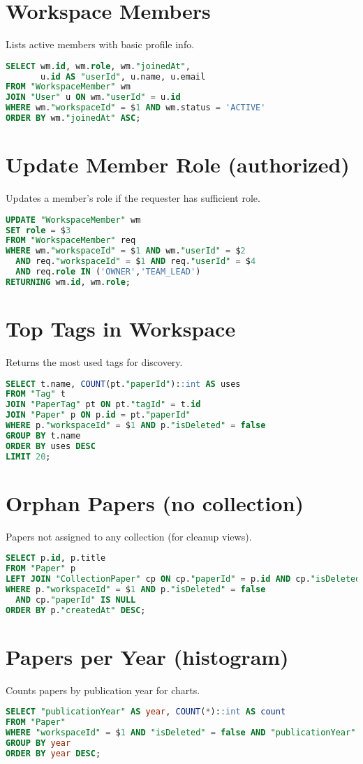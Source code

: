 \section{Workspace Members}
Lists active members with basic profile info.
\begin{lstlisting}[language=SQL]
SELECT wm.id, wm.role, wm."joinedAt",
       u.id AS "userId", u.name, u.email
FROM "WorkspaceMember" wm
JOIN "User" u ON wm."userId" = u.id
WHERE wm."workspaceId" = $1 AND wm.status = 'ACTIVE'
ORDER BY wm."joinedAt" ASC;
\end{lstlisting}

\section{Update Member Role (authorized)}
Updates a member's role if the requester has sufficient role.
\begin{lstlisting}[language=SQL]
UPDATE "WorkspaceMember" wm
SET role = $3
FROM "WorkspaceMember" req
WHERE wm."workspaceId" = $1 AND wm."userId" = $2
  AND req."workspaceId" = $1 AND req."userId" = $4
  AND req.role IN ('OWNER','TEAM_LEAD')
RETURNING wm.id, wm.role;
\end{lstlisting}

\section{Top Tags in Workspace}
Returns the most used tags for discovery.
\begin{lstlisting}[language=SQL]
SELECT t.name, COUNT(pt."paperId")::int AS uses
FROM "Tag" t
JOIN "PaperTag" pt ON pt."tagId" = t.id
JOIN "Paper" p ON p.id = pt."paperId"
WHERE p."workspaceId" = $1 AND p."isDeleted" = false
GROUP BY t.name
ORDER BY uses DESC
LIMIT 20;
\end{lstlisting}

\section{Orphan Papers (no collection)}
Papers not assigned to any collection (for cleanup views).
\begin{lstlisting}[language=SQL]
SELECT p.id, p.title
FROM "Paper" p
LEFT JOIN "CollectionPaper" cp ON cp."paperId" = p.id AND cp."isDeleted" = false
WHERE p."workspaceId" = $1 AND p."isDeleted" = false
  AND cp."paperId" IS NULL
ORDER BY p."createdAt" DESC;
\end{lstlisting}

\section{Papers per Year (histogram)}
Counts papers by publication year for charts.
\begin{lstlisting}[language=SQL]
SELECT "publicationYear" AS year, COUNT(*)::int AS count
FROM "Paper"
WHERE "workspaceId" = $1 AND "isDeleted" = false AND "publicationYear" IS NOT NULL
GROUP BY year
ORDER BY year DESC;
\end{lstlisting}
